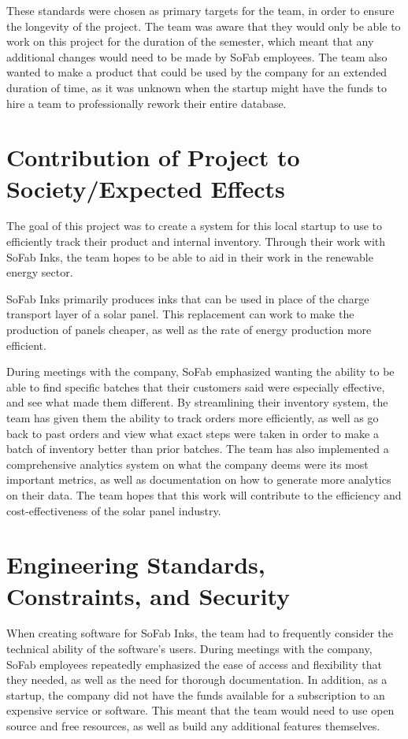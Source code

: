 \documentclass{article}
\begin{document}
These standards were chosen as primary targets for the team, in order to ensure the longevity of the project. The team was aware 
that they would only be able to work on this project for the duration of the semester, which meant that any additional changes 
would need to be made by SoFab employees. The team also wanted to make a product that could be used by the company for an extended 
duration of time, as it was unknown when the startup might have the funds to hire a team to professionally rework their entire 
database.

\section{Contribution of Project to Society\slash Expected Effects}
The goal of this project was to create a system for this local startup to use to efficiently track their product and internal 
inventory. Through their work with SoFab Inks, the team hopes to be able to aid in their work in the renewable energy sector. 

SoFab Inks primarily produces inks that can be used in place of the charge transport layer of a solar panel. This replacement can 
work to make the production of panels cheaper, as well as the rate of energy production more efficient.  

During meetings with the company, SoFab emphasized wanting the ability to be able to find specific batches that their customers 
said were especially effective, and see what made them different. By streamlining their inventory system, the team has given them 
the ability to track orders more efficiently, as well as go back to past orders and view what exact steps were taken in order to 
make a batch of inventory better than prior batches. The team has also implemented a comprehensive analytics system on what the 
company deems were its most important metrics, as well as documentation on how to generate more analytics on their data. The team 
hopes that this work will contribute to the efficiency and cost-effectiveness of the solar panel industry.  
\section{Engineering Standards, Constraints, and Security}
When creating software for SoFab Inks, the team had to frequently consider the technical ability of the software's users. During 
meetings with the company, SoFab employees repeatedly emphasized the ease of access and flexibility that they needed, as well as the 
need for thorough documentation. In addition, as a startup, the company did not have the funds available for a subscription to an 
expensive service or software. This meant that the team would need to use open source and free resources, as well as build any 
additional features themselves. 
\end{document}
